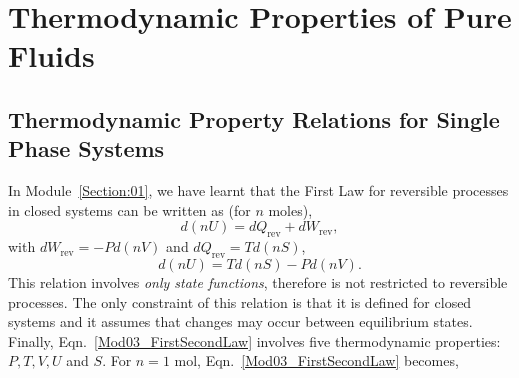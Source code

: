 \chapter{Thermodynamic Properties of Pure Fluids}\label{Section:03}


\section{Thermodynamic Property Relations for Single Phase Systems}

In Module~\ref{Section:01}, we have learnt that the First Law for reversible processes in closed systems can be written as (for $n$ moles),
   \begin{equation}
       d\left(n U\right) = d Q_{\text{rev}} + d W_{\text{rev}},\label{Mod03_FirstLaw}
   \end{equation} 
with $d W_{\text{rev}} = -Pd(nV)$ and $d Q_{\text{rev}}=Td(nS)$,
   \begin{equation}
       d\left(n U\right) = T d(nS) - Pd(nV).\label{Mod03_FirstSecondLaw}
   \end{equation} 
This relation involves {\it only state functions}, therefore is not restricted to reversible processes. The only constraint of this relation is that it is defined for closed systems and it assumes that changes may occur between equilibrium states. Finally, Eqn.~\ref{Mod03_FirstSecondLaw} involves five thermodynamic properties: $P, T, V, U$ and $S$. For $n=1$ mol, Eqn.~\ref{Mod03_FirstSecondLaw} becomes,
